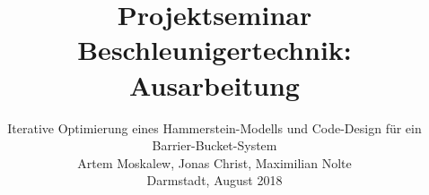 \documentclass[scrreprt,colorback,accentcolor=tud9b, 11pt]{tudreport}
\begin{document}
	\renewcommand{\importTikz}[1]{}			%

    \title{Projektseminar Beschleunigertechnik: Ausarbeitung}
    \subtitle{Iterative Optimierung eines Hammerstein-Modells und Code-Design für ein Barrier-Bucket-System
    		\\
    		Artem Moskalew, Jonas Christ,	Maximilian Nolte
    		\\
    		Darmstadt, August 2018}
    \maketitle

    \tableofcontents
    
    
	
	
	
	
	
	
	
	
	
	



\end{document}
